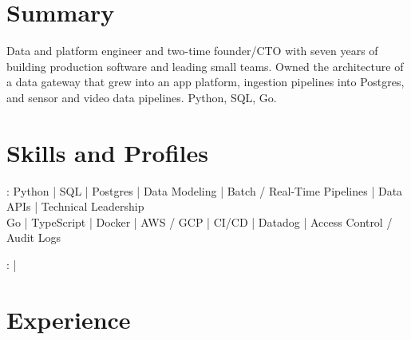 \documentclass[print]{jack-resume}
\begin{document}
\pagecolor{darkmodeBackground}


\begin{minipage}[t][1cm][t]{.03\textwidth}
    \hfill
\end{minipage}

\section{Summary}
Data and platform engineer and two-time founder/CTO with seven years of building production software and leading small teams. Owned the architecture of a data gateway that grew into an app platform, ingestion pipelines into Postgres, and sensor and video data pipelines. Python, SQL, Go.
\sectionsep

\section{Skills and Profiles}
:
Python \hfill | \hfill
SQL \hfill | \hfill
Postgres \hfill | \hfill
Data Modeling \hfill | \hfill
Batch / Real-Time Pipelines \hfill | \hfill
Data APIs \hfill | \hfill
Technical Leadership \\
\hspace{1.0cm} Go \hfill | \hfill
TypeScript \hfill | \hfill
Docker \hfill | \hfill
AWS / GCP \hfill | \hfill
CI/CD \hfill | \hfill
Datadog \hfill | \hfill
Access Control / Audit Logs \\

\raggedright{
    :
      \href{https://www.linkedin.com/in/jack-sturtevant/}{ \ExternalLink} |
     \href{https://github.com/jacksturt}{ \ExternalLink}}

\section{Experience}
\end{document}
